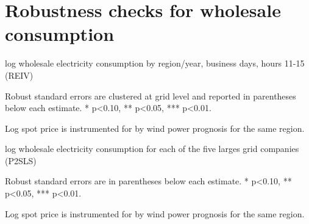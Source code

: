 \section{Robustness checks for wholesale consumption}
\label{app:robustness_wholesale}
\begin{table}[H]
\centering
\begin{threeparttable}
  \caption{log wholesale electricity consumption by region/year, business days, hours 11-15 (REIV)}
  \label{tab:ws_region_year}
  \footnotesize
    
    \begin{tablenotes}
    \item Robust standard errors are clustered at grid level and reported in parentheses below each estimate. * p<0.10, ** p<0.05, *** p<0.01.
    \item Log spot price is instrumented for by wind power prognosis for the same region.
  \end{tablenotes}
\end{threeparttable}
\end{table}
\begin{landscape}
\begin{table}[H]
\centering
\begin{threeparttable}
  \caption{log wholesale electricity consumption for each of the five larges grid companies (P2SLS)}
  \label{tab:ws_grids_large}
  \footnotesize
    
    \begin{tablenotes}
    \item Robust standard errors are in parentheses below each estimate. * p<0.10, ** p<0.05, *** p<0.01.
    \item Log spot price is instrumented for by wind power prognosis for the same region.
  \end{tablenotes}
\end{threeparttable}
\end{table}

\end{landscape}

